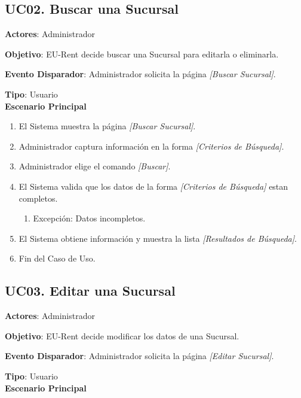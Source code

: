 \documentclass[10pt, letterpaper]{report}
\begin{document}
\subsection{UC02. Buscar una Sucursal} \label{BuscarSucursal}
\textbf{Actores}: Administrador

\textbf{Objetivo}: EU-Rent decide buscar una Sucursal para editarla o eliminarla.

\textbf{Evento Disparador}: Administrador solicita la página \textit{[Buscar Sucursal]}.

\textbf{Tipo}: Usuario\\

\textbf{Escenario Principal}

\begin{enumerate}
\item El Sistema muestra la página \textit{[Buscar Sucursal]}.
\item Administrador captura información en la forma \textit{[Criterios de Búsqueda]}.
\item Administrador elige el comando \textit{[Buscar]}.
\item El Sistema valida que los datos de la forma \textit{[Criterios de Búsqueda]} estan completos.
	\begin{enumerate}
		\item Excepción: Datos incompletos.
	\end{enumerate}
\item El Sistema obtiene información y muestra la lista \textit{[Resultados de Búsqueda]}.
\item Fin del Caso de Uso.
\end{enumerate}
\subsection{UC03. Editar una Sucursal} \label{EditarSucursal}
\textbf{Actores}: Administrador

\textbf{Objetivo}: EU-Rent decide modificar los datos de una Sucursal.

\textbf{Evento Disparador}: Administrador solicita la página \textit{[Editar Sucursal]}.

\textbf{Tipo}: Usuario\\

\textbf{Escenario Principal}
\end{document}

